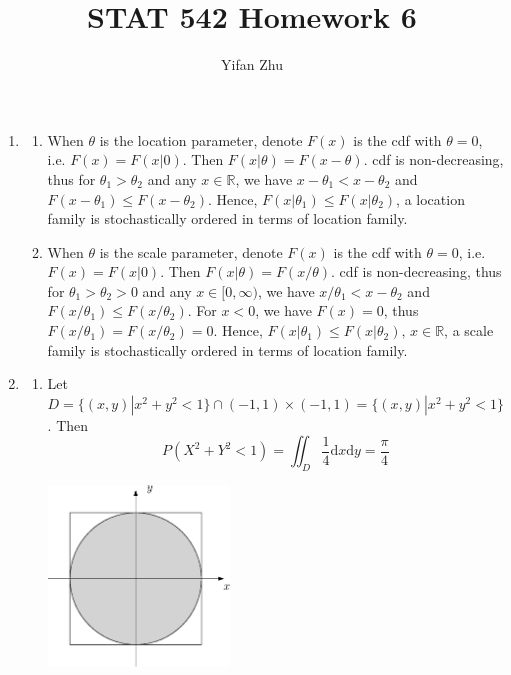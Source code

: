 \documentclass{article}
\begin{document}
	

	
	\title{STAT 542 Homework 6}
	\author{Yifan Zhu}
	\maketitle
	
	\begin{enumerate}[leftmargin = 0 em, label = \arabic*., font = \bfseries]
	\item 
	\begin{enumerate}
		\item When $\theta$ is the location parameter, denote $F(x)$ is the cdf with $\theta = 0$, i.e. $F(x) = F(x|0)$. Then $F(x|\theta) = F(x - \theta)$. cdf is non-decreasing, thus for $\theta_1 > \theta_2$ and any $x \in \mathbb{R}$, we have $x - \theta_1 < x - \theta_2$ and $F(x - \theta_1) \leq F(x - \theta_2)$. Hence, $F(x | \theta_1) \leq F(x|\theta_2)$, a location family is stochastically ordered in terms of location family.

		\item When $\theta$ is the scale parameter, denote $F(x)$ is the cdf with $\theta = 0$, i.e. $F(x) = F(x|0)$. Then $F(x|\theta) = F(x/\theta)$. cdf is non-decreasing, thus for $\theta_1 > \theta_2 > 0$ and any $x \in [0, \infty)$, we have $x / \theta_1 < x - \theta_2$ and $F(x / \theta_1) \leq F(x / \theta_2)$. For $x < 0$, we have $F(x) = 0$, thus $F(x / \theta_1) = F(x / \theta_2) = 0$. Hence, $F(x | \theta_1) \leq F(x|\theta_2),\, x \in \mathbb{R}$, a scale family is stochastically ordered in terms of location family.

	\end{enumerate}

	\item 
	\begin{enumerate}
		\item Let $D = \{(x,y)| x^2 + y^2 < 1\} \cap (-1,1)\times (-1,1) = \{(x,y)| x^2 + y^2 < 1\}$. Then
		\[P(X^2 + Y^2 < 1) = \iint_{D} \frac{1}{4} \mathrm{d}x \mathrm{d}y = \frac{\pi}{4}\]
		\begin{center}
		\includegraphics[width = 0.4\textwidth]{2a.eps}
		\end{center}


\end{enumerate}
\end{enumerate}
\end{document}
